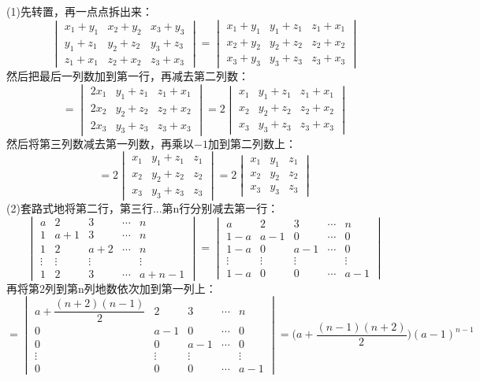 \begin{solution}
    (1)先转置，再一点点拆出来：\[
    \begin{vmatrix}x_1+y_1&x_2+y_2&x_3+y_3\\y_1+z_1&y_2+z_2&y_3+z_3\\z_1+x_1&z_2+x_2&z_3+x_3\end{vmatrix}
    =\begin{vmatrix}x_1+y_1&y_1+z_1&z_1+x_1\\x_2+y_2&y_2+z_2&z_2+x_2\\x_3+y_3&y_3+z_3&z_3+x_3\end{vmatrix}
    \]然后把最后一列数加到第一行，再减去第二列数：\[
    =\begin{vmatrix}2x_1&y_1+z_1&z_1+x_1\\2x_2&y_2+z_2&z_2+x_2\\2x_3&y_3+z_3&z_3+x_3\end{vmatrix}
    =2\begin{vmatrix}x_1&y_1+z_1&z_1+x_1\\x_2&y_2+z_2&z_2+x_2\\x_3&y_3+z_3&z_3+x_3\end{vmatrix}\]
    然后将第三列数减去第一列数，再乘以$-1$加到第二列数上：\\\vspace{-10pt}\[
    =2\begin{vmatrix}x_1&y_1+z_1&z_1\\x_2&y_2+z_2&z_2\\x_3&y_3+z_3&z_3\end{vmatrix}
    =2\begin{vmatrix}x_1&y_1&z_1\\x_2&y_2&z_2\\x_3&y_3&z_3\end{vmatrix}
    \]
    (2)套路式地将第二行，第三行...第n行分别减去第一行：\[
    \begin{vmatrix}a&2&3&\cdots&n\\1&a+1&3&\cdots&n\\1&2&a+2&\cdots&n\\\vdots&\vdots&\vdots&&\vdots\\1&2&3&\cdots&a+n-1\end{vmatrix}
    =\begin{vmatrix}a&2&3&\cdots&n\\1-a&a-1&0&\cdots&0\\1-a&0&a-1&\cdots&0\\\vdots&\vdots&\vdots&&\vdots\\1-a&0&0&\cdots&a-1\end{vmatrix}
    \]再将第2列到第n列地数依次加到第一列上：\[
    =\begin{vmatrix}a+\dfrac{(n+2)(n-1)}{2}&2&3&\cdots&n\\0&a-1&0&\cdots&0\\0&0&a-1&\cdots&0\\\vdots&\vdots&\vdots&&\vdots\\0&0&0&\cdots&a-1\end{vmatrix}
    =\bigg(a+\dfrac{(n-1)(n+2)}{2}\bigg)(a-1)^{n-1}\]
\end{solution}
